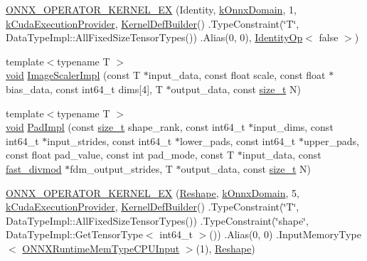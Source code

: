 \begin{DoxyCompactItemize}
\item 
\mbox{\hyperlink{namespaceonnxruntime_1_1cuda_ab094d8bf7dcafb72572043bb3e3ea33e}{O\+N\+N\+X\+\_\+\+O\+P\+E\+R\+A\+T\+O\+R\+\_\+\+K\+E\+R\+N\+E\+L\+\_\+\+EX}} (Identity, \mbox{\hyperlink{namespaceonnxruntime_ac0e7c0c106a2c9e9594560a3ab289fa0}{k\+Onnx\+Domain}}, 1, \mbox{\hyperlink{namespaceonnxruntime_a73ebc64887ddd1968e3cef47ffefe35b}{k\+Cuda\+Execution\+Provider}}, \mbox{\hyperlink{classonnxruntime_1_1KernelDefBuilder}{Kernel\+Def\+Builder}}() .Type\+Constraint(\char`\"{}T\char`\"{}, Data\+Type\+Impl\+::\+All\+Fixed\+Size\+Tensor\+Types()) .Alias(0, 0), \mbox{\hyperlink{classonnxruntime_1_1cuda_1_1IdentityOp}{Identity\+Op}}$<$ false $>$)
\item 
{\footnotesize template$<$typename T $>$ }\\\mbox{\hyperlink{mlasi_8h_a88f941d423cb2a819b70a1358982b1a6}{void}} \mbox{\hyperlink{namespaceonnxruntime_1_1cuda_a57b6bca9b2d68ad8f4a8eb1e0d8cca75}{Image\+Scaler\+Impl}} (const T $\ast$input\+\_\+data, const float scale, const float $\ast$bias\+\_\+data, const int64\+\_\+t dims\mbox{[}4\mbox{]}, T $\ast$output\+\_\+data, const \mbox{\hyperlink{mlasi_8h_a503efbc1c6e50825320ad909366b78ab}{size\+\_\+t}} N)
\item 
{\footnotesize template$<$typename T $>$ }\\\mbox{\hyperlink{mlasi_8h_a88f941d423cb2a819b70a1358982b1a6}{void}} \mbox{\hyperlink{namespaceonnxruntime_1_1cuda_a89919b025b81f1491d68cc99fb35ff6d}{Pad\+Impl}} (const \mbox{\hyperlink{mlasi_8h_a503efbc1c6e50825320ad909366b78ab}{size\+\_\+t}} shape\+\_\+rank, const int64\+\_\+t $\ast$input\+\_\+dims, const int64\+\_\+t $\ast$input\+\_\+strides, const int64\+\_\+t $\ast$lower\+\_\+pads, const int64\+\_\+t $\ast$upper\+\_\+pads, const float pad\+\_\+value, const int pad\+\_\+mode, const T $\ast$input\+\_\+data, const \mbox{\hyperlink{classonnxruntime_1_1cuda_1_1fast__divmod}{fast\+\_\+divmod}} $\ast$fdm\+\_\+output\+\_\+strides, T $\ast$output\+\_\+data, const \mbox{\hyperlink{mlasi_8h_a503efbc1c6e50825320ad909366b78ab}{size\+\_\+t}} N)
\item 
\mbox{\hyperlink{namespaceonnxruntime_1_1cuda_ae4edb27b0447ecdd2ee4c7cea46eda01}{O\+N\+N\+X\+\_\+\+O\+P\+E\+R\+A\+T\+O\+R\+\_\+\+K\+E\+R\+N\+E\+L\+\_\+\+EX}} (\mbox{\hyperlink{classonnxruntime_1_1cuda_1_1Reshape}{Reshape}}, \mbox{\hyperlink{namespaceonnxruntime_ac0e7c0c106a2c9e9594560a3ab289fa0}{k\+Onnx\+Domain}}, 5, \mbox{\hyperlink{namespaceonnxruntime_a73ebc64887ddd1968e3cef47ffefe35b}{k\+Cuda\+Execution\+Provider}}, \mbox{\hyperlink{classonnxruntime_1_1KernelDefBuilder}{Kernel\+Def\+Builder}}() .Type\+Constraint(\char`\"{}T\char`\"{}, Data\+Type\+Impl\+::\+All\+Fixed\+Size\+Tensor\+Types()) .Type\+Constraint(\char`\"{}shape\char`\"{}, Data\+Type\+Impl\+::\+Get\+Tensor\+Type$<$ int64\+\_\+t $>$()) .Alias(0, 0) .Input\+Memory\+Type$<$ \mbox{\hyperlink{allocator__info_8h_add3f8ee3ff93395704abae71c30cab18a3127507f1d160fd6348370cc7bd42245}{O\+N\+N\+X\+Runtime\+Mem\+Type\+C\+P\+U\+Input}} $>$(1), \mbox{\hyperlink{classonnxruntime_1_1cuda_1_1Reshape}{Reshape}})

\end{DoxyCompactItemize}
